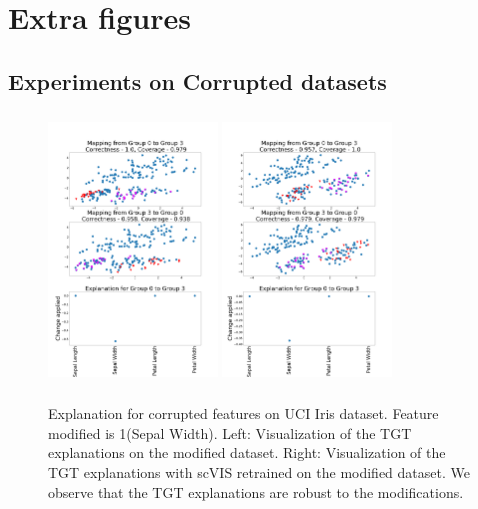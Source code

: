 \section{Extra figures}
\subsection{Experiments on Corrupted datasets}
\label{app:t2c}
\begin{figure}[H]
    \centering
    \includegraphics[width=0.4\textwidth, height=7.2cm]{../openreview/images/tffigures/iris-t2c.png}
    \includegraphics[width=0.4\textwidth, height=7.2cm]{../openreview/images/tffigures/iris-retrained-t2c.png}
    \caption{Explanation for corrupted features on UCI Iris dataset. Feature modified is 1(Sepal Width). Left: Visualization of the TGT explanations on the modified dataset. Right: Visualization of the TGT explanations with scVIS retrained on the modified dataset. We observe that the TGT explanations are robust to the modifications.}
    \label{fig:t2c-Iris}
\end{figure}
